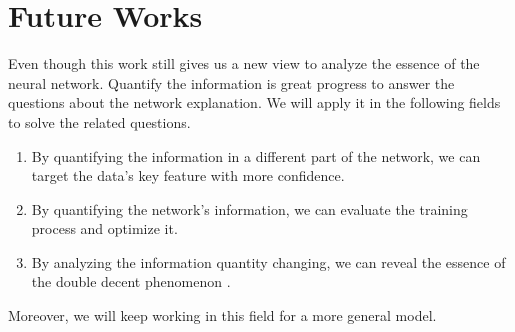 \documentclass[letterpaper]{article} %
\begin{document}
\section{Future Works}
Even though this work still gives us a new view to analyze the essence of the neural network. Quantify the information is great progress to answer the questions about the network explanation. We will apply it in the following fields to solve the related questions.
\begin{enumerate}
    \item By quantifying the information in a different part of the network, we can target the data's key feature with more confidence.
    \item By quantifying the network's information, we can evaluate the training process and optimize it.
    \item By analyzing the information quantity changing, we can reveal the essence of the double decent phenomenon \cite{nakkiran2019deep}.
\end{enumerate}
Moreover, we will keep working in this field for a more general model.


\end{document}
